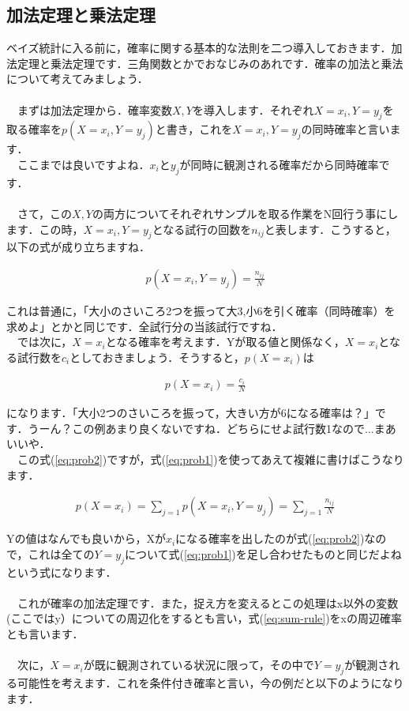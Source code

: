 \documentclass[11pt,a4paper]{jsarticle}                    %
\begin{document}
\subsection{加法定理と乗法定理}
ベイズ統計に入る前に，確率に関する基本的な法則を二つ導入しておきます．加法定理と乗法定理です．三角関数とかでおなじみのあれです．確率の加法と乗法について考えてみましょう．\\
\\
　まずは加法定理から．確率変数$X,Y$を導入します．それぞれ$X=x_i, Y=y_j$を取る確率を$p(X=x_i, Y=y_j)$と書き，これを$X=x_i, Y=y_j$の同時確率と言います．\\
　ここまでは良いですよね．$x_iとy_j$が同時に観測される確率だから同時確率です．\\
\\
　さて，この$X, Y$の両方についてそれぞれサンプルを取る作業をN回行う事にします．この時，$X=x_i, Y=y_j$となる試行の回数を$n_{ij}$と表します．こうすると，以下の式が成り立ちますね．

\begin{eqnarray}
\label{eq:prob1}
p(X=x_i, Y=y_j) = \frac{n_{ij}}{N}
\end{eqnarray}

これは普通に，「大小のさいころ2つを振って大3,小6を引く確率（同時確率）を求めよ」とかと同じです．全試行分の当該試行ですね．
\\
　では次に，$X=x_i$となる確率を考えます．Yが取る値と関係なく，$X=x_i$となる試行数を$c_i$としておきましょう．そうすると，$p(X=x_i)$は

\begin{eqnarray}
\label{eq:prob2}
p(X=x_i) = \frac{c_i}{N}
\end{eqnarray}

になります．「大小2つのさいころを振って，大きい方が6になる確率は？」です．うーん？この例あまり良くないですね．どちらにせよ試行数1なので...まあいいや．\\
　この式(\ref{eq:prob2})ですが，式(\ref{eq:prob1})を使ってあえて複雑に書けばこうなります．

\begin{eqnarray}
\label{eq:sum-rule}
p(X=x_i) = \sum_{j=1} p(X=x_i, Y=y_j) = \sum_{j=1} \frac{n_{ij}}{N}
\end{eqnarray}

Yの値はなんでも良いから，Xが$x_i$になる確率を出したのが式(\ref{eq:prob2})なので，これは全ての$Y=y_j$について式(\ref{eq:prob1})を足し合わせたものと同じだよねという式になります．\\
\\
　これが確率の加法定理です．また，捉え方を変えるとこの処理はx以外の変数(ここではy）についての周辺化をするとも言い，式(\ref{eq:sum-rule})をxの周辺確率とも言います．\\
\\
　次に，$X=x_i$が既に観測されている状況に限って，その中で$Y=y_j$が観測される可能性を考えます．これを条件付き確率と言い，今の例だと以下のようになります．
\end{document}
